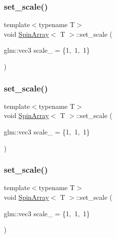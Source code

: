 \mbox{\label{classSpinArray_acc4dd3d5a680c195ebaea00120bd5ed8}} 
\subsubsection{\texorpdfstring{set\+\_\+scale()}{set\_scale()}\hspace{0.1cm}{\footnotesize\ttfamily [2/4]}}
{\footnotesize\ttfamily template$<$typename T$>$ \\
void \mbox{\hyperlink{classSpinArray}{Spin\+Array}}$<$ T $>$\+::set\+\_\+scale (\begin{DoxyParamCaption}\item[{glm\+::vec3}]{scale\+\_\+ = {\ttfamily \{1,~1,~1\}} }\end{DoxyParamCaption})\hspace{0.3cm}{\ttfamily [inline]}}

\mbox{\label{classSpinArray_acc4dd3d5a680c195ebaea00120bd5ed8}} 
\subsubsection{\texorpdfstring{set\+\_\+scale()}{set\_scale()}\hspace{0.1cm}{\footnotesize\ttfamily [3/4]}}
{\footnotesize\ttfamily template$<$typename T$>$ \\
void \mbox{\hyperlink{classSpinArray}{Spin\+Array}}$<$ T $>$\+::set\+\_\+scale (\begin{DoxyParamCaption}\item[{glm\+::vec3}]{scale\+\_\+ = {\ttfamily \{1,~1,~1\}} }\end{DoxyParamCaption})\hspace{0.3cm}{\ttfamily [inline]}}

\mbox{\label{classSpinArray_acc4dd3d5a680c195ebaea00120bd5ed8}} 
\subsubsection{\texorpdfstring{set\+\_\+scale()}{set\_scale()}\hspace{0.1cm}{\footnotesize\ttfamily [4/4]}}
{\footnotesize\ttfamily template$<$typename T$>$ \\
void \mbox{\hyperlink{classSpinArray}{Spin\+Array}}$<$ T $>$\+::set\+\_\+scale (\begin{DoxyParamCaption}\item[{glm\+::vec3}]{scale\+\_\+ = {\ttfamily \{1,~1,~1\}} }\end{DoxyParamCaption})\hspace{0.3cm}{\ttfamily [inline]}}



